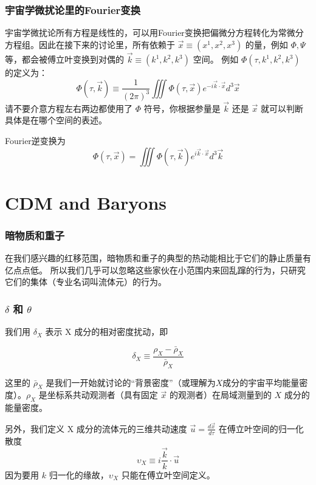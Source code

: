 \documentclass[CJK,13pt]{beamer}
\begin{document}
  
 \begin{frame}
    \frametitle{宇宙学微扰论里的Fourier变换}
    宇宙学微扰论所有方程是线性的，可以用Fourier变换把偏微分方程转化为常微分方程组。因此在接下来的讨论里，所有依赖于 $\vec{x} \equiv (x^1,x^2,x^3)$ 的量，例如 $\Phi, \Psi$ 等，都会被傅立叶变换到对偶的 $\vec{k}\equiv (k^1, k^2, k^3)$ 空间。
    例如 $\Phi(\tau, k^1, k^2, k^3)$ 的定义为：
    $$\Phi(\tau, \vec{k})\equiv \frac{1}{(2\pi)^3}\iiint \Phi(\tau, \vec{x}) e^{-i\vec{k}\cdot\vec{x}}d^3\vec{x}$$
    请不要介意方程左右两边都使用了 $\Phi$ 符号，你根据参量是 $\vec{k}$ 还是 $\vec{x}$ 就可以判断具体是在哪个空间的表述。

    \skipline

    Fourier逆变换为
    $$\Phi(\tau, \vec{x}) = \iiint \Phi(\tau, \vec{k}) e^{i\vec{k}\cdot\vec{x}}d^3\vec{k}$$

  \end{frame}
  

 \section{CDM and Baryons}

  \begin{frame}
    \frametitle{暗物质和重子}
    在我们感兴趣的红移范围，暗物质和重子的典型的热动能相比于它们的静止质量有亿点点低。 所以我们几乎可以忽略这些家伙在小范围内来回乱蹿的行为，只研究它们的集体（专业名词叫流体元）的行为。

    \bcenter
        
    \ecenter
  \end{frame}

  \begin{frame}
    \frametitle{$\delta$ 和 $\theta$}
    我们用 $\delta_X$ 表示 X 成分的相对密度扰动，即

    {\blue $$\delta_X\equiv \frac{\rho_X - \bar{\rho}_X}{\bar{\rho}_X}$$}

    这里的 $\bar{\rho}_X$ 是我们一开始就讨论的“背景密度”（或理解为$X$成分的宇宙平均能量密度）。$\rho_X$ 是坐标系共动观测者（具有固定 $\vec{x}$ 的观测者）在局域测量到的 $X$ 成分的能量密度。

    \skipline
    
    另外，我们定义 X 成分的流体元的三维共动速度 $\vec{u} = \frac{d\vec{x}}{d\tau}$ 在傅立叶空间的归一化散度
    {\blue $$\upsilon_X\equiv i\frac{\vec{k}}{k} \cdot \vec{u}$$}
     因为要用 $k$ 归一化的缘故，$\upsilon_X$ 只能在傅立叶空间定义。

  \end{frame}
\end{document}
